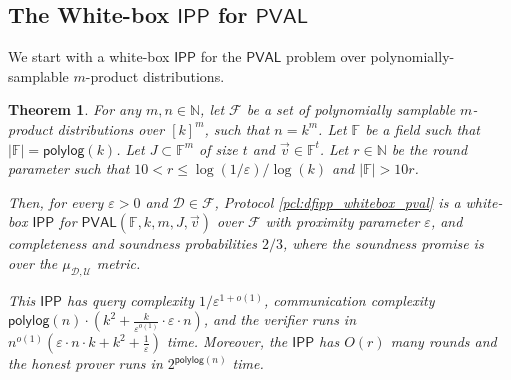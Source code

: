 \documentclass[11pt]{article}
\newtheorem{theorem}{Theorem}[section]
\newcommand{\polylog}{\mathsf{polylog}}
\newcommand{\PVAL}{\mathsf{PVAL}}
\newcommand{\IPP}{\mathsf{IPP}}
\newcommand{\F}{\mathbb{F}}
\newcommand{\N}{\mathbb{N}}
\newcommand{\sU}{\mathcal{U}}
\newcommand{\sD}{\mathcal{D}}
\newcommand{\sF}{\mathcal{F}}
\newcommand{\eps}{\varepsilon}
\begin{document}
\subsection{The White-box $\IPP$ for $\PVAL$}
\label{sec:final_wb_ipp_prod}
We start with a white-box $\IPP$ for the $\PVAL$ problem over polynomially-samplable $m$-product distributions.
\begin{theorem}
    \label{thm:wb_dfipp_prod_pval}
    For any $m,n \in \N$, let $\sF$ be a set of polynomially samplable $m$-product distributions over $[k]^m$, such that $n = k^m$. Let $\F$ be a field such that $|\F|=\polylog(k)$. Let $J \subset \F^m$ of size $t$ and $\Vec{v} \in \F^t$. Let $r \in \N$ be the round parameter such that $10 < r \leq \log (1/\varepsilon)/\log (k)$ and $|\F|>10r$. 

    Then, for every $\varepsilon > 0$ and $\sD \in \sF$, Protocol \ref{pcl:dfipp_whitebox_pval} is a white-box $\IPP$ for $\PVAL(\F,k,m,J,\Vec{v})$ over $\sF$ with proximity parameter $\varepsilon$, and completeness and soundness probabilities $2/3$, where the soundness promise is over the $\mu_{\sD,\sU}$ metric. 
    
    This $\IPP$ has query complexity $1/\varepsilon^{1+o(1)}$, communication complexity $\polylog(n) \cdot \left(k^{2}+\frac{k}{\varepsilon^{o(1)}}\cdot \eps \cdot n \right)$, and the verifier runs in $n^{o(1)}(\eps \cdot n \cdot k +k^{2}+ \frac{1}{\varepsilon})$ time. Moreover, the $\IPP$ has $O(r)$ many rounds and the honest prover runs in $2^{\polylog(n)}$ time.
\end{theorem}
\end{document}
